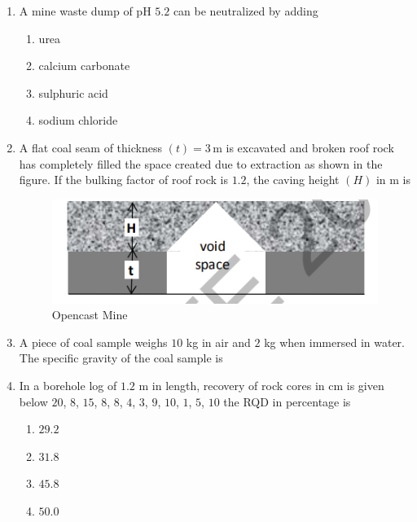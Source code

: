 \documentclass[journal,12pt,onecolumn]{IEEEtran}
\theoremstyle{remark}
\begin{document}
\begin{enumerate}
\item A mine waste dump of pH $5.2$ can be neutralized by adding


\hfill{}
\begin{multicols}{4}
\begin{enumerate}
\item urea
\item calcium carbonate
\item sulphuric acid
\item sodium chloride
\end{enumerate}
\end{multicols}

\item A flat coal seam of thickness $(t) = 3 \,\text{m}$ is excavated and broken roof rock has completely filled the space created due to extraction as shown in the figure. If the bulking factor of roof rock is $1.2$, the caving height $(H)$ in m is 
\begin{figure}[H]
  \centering
  \includegraphics[width=0.4\columnwidth]{figs/flat coal.png}
  \caption{Opencast Mine}
  \label{fig:30}
\end{figure}


\hfill{}

\item A piece of coal sample weighs $10$ kg in air and $2$ kg when immersed in water. The specific gravity
of the coal sample is

\hfill{}

\item In a borehole log of $1.2$ m in length, recovery of rock cores in cm is given below
$20$, $8$, $15$, $8$, $8$, $4$, $3$, $9$, $10$, $1$, $5$, $10$ 
the RQD in percentage is 

\hfill{}

\begin{multicols}{4}
\begin{enumerate}
\item $29.2$
\item $31.8$
\item $45.8$
\item $50.0$
\end{enumerate}
\end{multicols}


\end{enumerate}
\end{document}
